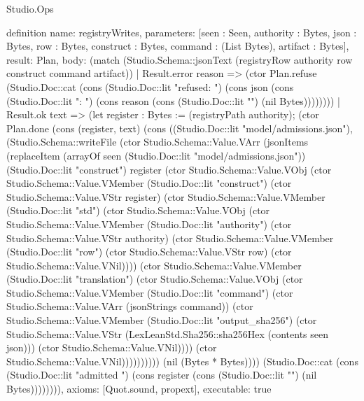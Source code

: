 \begin{lexlean}{Studio.Ops}
\begin{semanticmodule}
{definition{
  name: registryWrites,
  parameters: [seen : Seen, authority : Bytes, json : Bytes, row : Bytes, construct : Bytes, command : (List Bytes), artifact : Bytes],
  result: Plan,
  body: (match (Studio.Schema::jsonText (registryRow authority row construct command artifact))
    | Result.error reason => (ctor Plan.refuse (Studio.Doc::cat (cons (Studio.Doc::lit "refused: ") (cons json (cons (Studio.Doc::lit ": ") (cons reason (cons (Studio.Doc::lit "\n") (nil Bytes))))))))
    | Result.ok text => (let register : Bytes := (registryPath authority); (ctor Plan.done (cons (register, text) (cons ((Studio.Doc::lit "model/admissions.json"), (Studio.Schema::writeFile (ctor Studio.Schema::Value.VArr (jsonItems (replaceItem (arrayOf seen (Studio.Doc::lit "model/admissions.json")) (Studio.Doc::lit "construct") register (ctor Studio.Schema::Value.VObj (ctor Studio.Schema::Value.VMember (Studio.Doc::lit "construct") (ctor Studio.Schema::Value.VStr register) (ctor Studio.Schema::Value.VMember (Studio.Doc::lit "std") (ctor Studio.Schema::Value.VObj (ctor Studio.Schema::Value.VMember (Studio.Doc::lit "authority") (ctor Studio.Schema::Value.VStr authority) (ctor Studio.Schema::Value.VMember (Studio.Doc::lit "row") (ctor Studio.Schema::Value.VStr row) (ctor Studio.Schema::Value.VNil)))) (ctor Studio.Schema::Value.VMember (Studio.Doc::lit "translation") (ctor Studio.Schema::Value.VObj (ctor Studio.Schema::Value.VMember (Studio.Doc::lit "command") (ctor Studio.Schema::Value.VArr (jsonStrings command)) (ctor Studio.Schema::Value.VMember (Studio.Doc::lit "output_sha256") (ctor Studio.Schema::Value.VStr (LexLeanStd.Sha256::sha256Hex (contents seen json))) (ctor Studio.Schema::Value.VNil)))) (ctor Studio.Schema::Value.VNil)))))))))) (nil (Bytes * Bytes)))) (Studio.Doc::cat (cons (Studio.Doc::lit "admitted ") (cons register (cons (Studio.Doc::lit "\n") (nil Bytes)))))))),
  axioms: [Quot.sound, propext],
  executable: true
}

}
\end{semanticmodule}
\end{lexlean}
